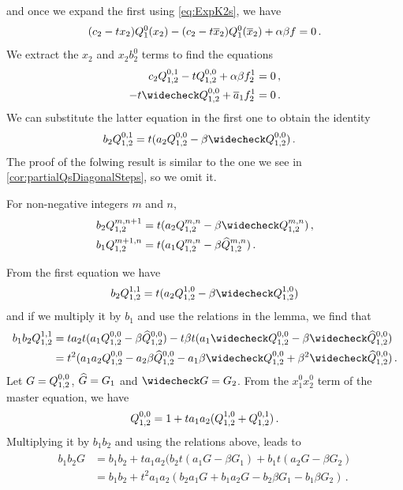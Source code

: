 \noindent and once we expand the first using \autoref{eq:ExpK2s}, we have
\begin{align}
	(c_2-tx_2)Q_1^0(x_2) - (c_2-t\overline{x}_2)Q_1^0(\overline{x}_2) + \alpha\beta f = 0\,.
\end{align}
We extract the $x_2$ and $x_2b_2^0$ terms to find the equations
\begin{align}
	c_2Q_{1,2}^{0,1}-t Q_{1,2}^{0,0} + \alpha\beta f_2^1 &= 0\,,\\
	- t \wc Q_{1,2}^{0,0} +  \ol a_1f_2^1&=0\,.
\end{align}
We can substitute the latter equation in the first one to obtain the identity
\begin{align}
	b_2 Q_{1,2}^{0,1} &= t(a_2 Q_{1,2}^{0,0} - \beta \wc Q_{1,2}^{0,0})\,.
\end{align}
The proof of the folwing result is similar to the one we see in \autoref{cor:partialQsDiagonalSteps}, so we omit it.
\begin{lem} \label{lem:partialQs}For non-negative integers $m$ and $n$,
\begin{align}
	b_2\Qf{m,n + 1} &= t(a_2\Qf{m,n}-\beta \Qc{m,n})\,,\\
	b_1\Qf{m + 1,n} &= t(a_1\Qf{m,n}-\beta \Qh{m,n})\,.
\end{align}
\end{lem}
From the first equation we have
\begin{align}
	b_2\Qf{1,1} = t(a_2\Qf{1,0}-\beta \Qc{1,0})
\end{align}
and if we multiply it by $b_1$ and use the relations in the lemma, we find that
\begin{align}
	\begin{split}
		b_1b_2 \Qf{1,1} &=t a_2t(a_1\Qf{0,0}-\beta \Qh{0,0})-t\beta t(a_1\Qc{0,0}-\beta\Qch{0,0})\\	
		&=t^2(a_1a_2\Qf{0,0}-a_2\beta\Qh{0,0}-a_1\beta\Qc{0,0} + \beta^2\Qch{0,0})\,.
	\end{split}
\end{align}
Let $G = Q_{1,2}^{0,0}$, $\widehat G = G_1$ and $\wc G = G_2$. From the $x_1^0 x_2^0$ term of the master equation, we have
\begin{align}
	Q_{1,2}^{0,0} = 1 + t a_1a_2(Q_{1,2}^{1,0} + Q_{1,2}^{0,1})\,.
\end{align}
Multiplying it by $b_1b_2$ and using the relations above, leads to
\begin{align}
	\begin{split}
		b_1b_2 G &=b_1b_2 + ta_1a_2(b_2t(a_1G-\beta G_1) + b_1t(a_2 G- \beta G_2)\\
		&=b_1b_2 + t^2a_1a_2(b_2a_1G + b_1a_2G-b_2\beta G_1-b_1\beta G_2)\,.
	\end{split}
\end{align}
